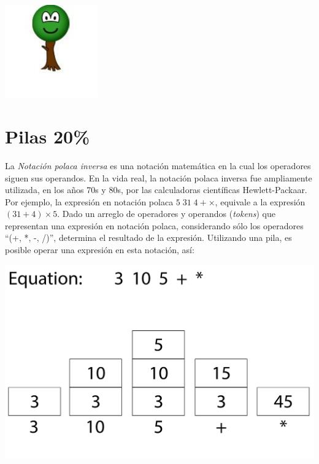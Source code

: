 \documentclass[10 pt]{article}
\begin{document}
\begin{center}
\includegraphics[width=0.3\textwidth]{tree.jpg}
\end{center}

\newpage



\section{Pilas 20\%}


La \textit{Notación polaca inversa} es una notación matemática en la cual los operadores siguen sus operandos. En la vida real, la notación polaca inversa fue ampliamente utilizada, en los años 70s y 80s, por las calculadoras científicas 
Hewlett-Packaar. Por ejemplo, la expresión en notación polaca $5\;31\;4 + \times$, equivale a la expresión $(31 + 4) \times 5$. Dado  un arreglo de operadores y operandos (\textit{tokens}) que representan una expresión en notación polaca, considerando sólo  los operadores ``(+, *, -, /)'', determina el resultado de la expresión. Utilizando una pila, es posible operar una expresión en esta notación, así:

\hspace{1 cm}

\includegraphics[scale=0.07]{ReversePolishNotationStackExample.jpg}
\end{document}
